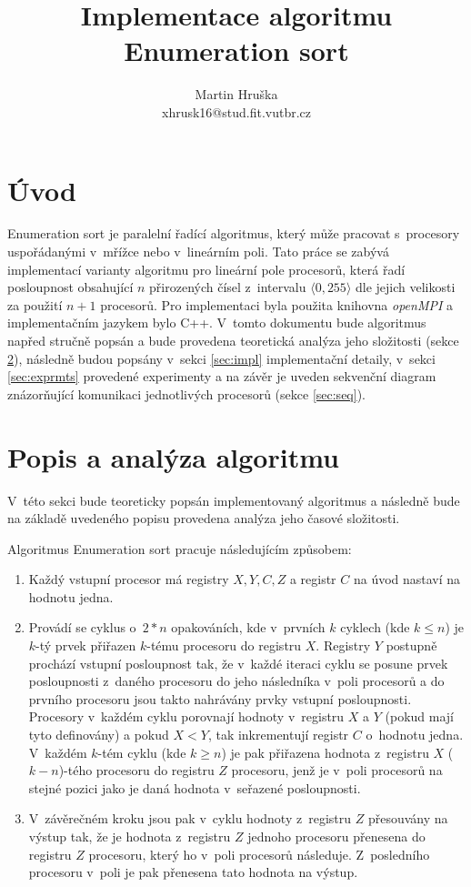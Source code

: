 \documentclass[a4paper, 12pt]{article}
\title{Implementace algoritmu Enumeration sort}
\author{Martin Hruška\\xhrusk16@stud.fit.vutbr.cz}
\date{}
\begin{document}
\maketitle

\section{Úvod}
\label{sec:intro}
Enumeration sort je paralelní řadící algoritmus, který může pracovat s~procesory uspořádanými v~mřížce nebo v~lineárním poli.
Tato práce se zabývá implementací varianty algoritmu pro lineární pole procesorů, která řadí
posloupnost obsahující $n$ přirozených čísel z~intervalu $\langle 0,255 \rangle$ dle jejich velikosti za použití $n+1$ procesorů.
Pro implementaci byla použita knihovna \emph{openMPI} a implementačním jazykem bylo C++.
V~tomto dokumentu bude algoritmus napřed
stručně popsán a bude provedena teoretická analýza jeho složitosti (sekce \ref{sec:analysis}),
následně budou popsány v~sekci \ref{sec:impl} implementační detaily,
v~sekci \ref{sec:exprmts} provedené experimenty
a na závěr je uveden sekvenční diagram znázorňující komunikaci jednotlivých procesorů (sekce \ref{sec:seq}).

\section{Popis a analýza algoritmu}
\label{sec:analysis}
V~této sekci bude teoreticky popsán implementovaný algoritmus a následně bude na základě uvedeného popisu provedena
analýza jeho časové složitosti.

Algoritmus Enumeration sort pracuje následujícím způsobem:
\begin{enumerate}
\item Každý vstupní procesor má registry $X, Y, C, Z$ a registr $C$ na úvod nastaví
na hodnotu jedna.
\item Provádí se cyklus o~$2*n$ opakováních, kde v~prvních $k$ cyklech (kde $k\leq n$)
je $k$-tý prvek přiřazen $k$-tému procesoru do registru $X$.
Registry $Y$ postupně prochází vstupní posloupnost tak, že v~každé iteraci cyklu se posune prvek posloupnosti z~daného procesoru
do jeho následníka v~poli procesorů a do prvního procesoru jsou takto nahrávány prvky vstupní posloupnosti.
Procesory v~každém cyklu porovnají hodnoty v~registru $X$ a $Y$ (pokud mají tyto definovány)
a pokud $X < Y$, tak inkrementují registr $C$ o~hodnotu jedna.
V~každém $k$-tém cyklu (kde $k \geq n$) je pak přiřazena hodnota z~registru $X$ ($k-n$)-tého procesoru do registru $Z$ procesoru,
jenž je v~poli procesorů na stejné pozici jako je daná hodnota v~seřazené posloupnosti.
\item V~závěrečném kroku jsou pak v~cyklu hodnoty z~registru $Z$ přesouvány na výstup tak, že je hodnota
z~registru $Z$ jednoho procesoru přenesena do registru $Z$ procesoru, který ho v~poli procesorů následuje.
Z~posledního procesoru v~poli je pak přenesena tato hodnota na výstup.
\end{enumerate}
\end{document}
